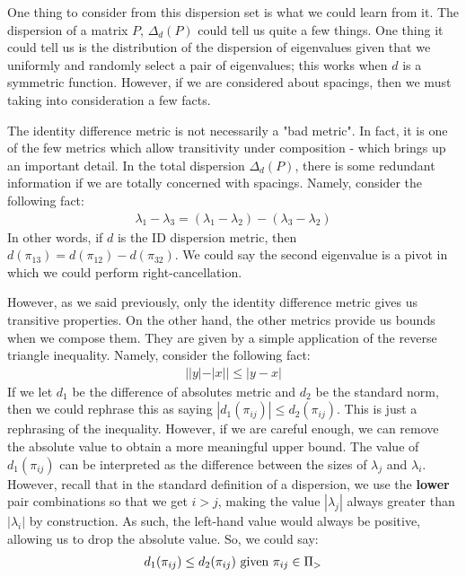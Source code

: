 
One thing to consider from this dispersion set is what we could learn from it. The dispersion of a matrix $P$, $\Delta_d(P)$ could tell us quite a few things. One thing it could tell us is the distribution of the dispersion of eigenvalues given that we uniformly and randomly select a pair of eigenvalues; this works when $d$ is a symmetric function. However, if we are considered about spacings, then we must taking into consideration a few facts.


The identity difference metric is not necessarily a "bad metric". In fact, it is one of the few metrics which allow transitivity under composition - which brings up an important detail. In the total dispersion $\Delta_d(P)$, there is some redundant information if we are totally concerned with spacings. Namely, consider the following fact:
\begin{align*}
\lambda_1 - \lambda_3 = (\lambda_1 - \lambda_2) - (\lambda_3 - \lambda_2)
\end{align*}
In other words, if $d$ is the ID dispersion metric, then $d(\pi_{13}) = d(\pi_{12}) - d(\pi_{32})$. We could say the second eigenvalue is a pivot in which we could perform right-cancellation.


However, as we said previously, only the identity difference metric gives us transitive properties. On the other hand, the other metrics provide us bounds when we compose them. They are given by a simple application of the reverse triangle inequality. Namely, consider the following fact:
\begin{align*}
||y| - |x|| \leq |y - x|
\end{align*}
If we let $d_1$ be the difference of absolutes metric and $d_2$ be the standard norm, then we could rephrase this as saying $|d_1(\pi_{ij})| \leq d_2(\pi_{ij})$. This is just a rephrasing of the inequality. However, if we are careful enough, we can remove the absolute value to obtain a more meaningful upper bound. The value of $d_1(\pi_{ij})$ can be interpreted as the difference between the sizes of $\lambda_j$ and $\lambda_i$. However, recall that in the standard definition of a dispersion, we use the \textbf{lower} pair combinations so that we get $i > j$, making the value $|\lambda_j|$ always greater than $|\lambda_i|$ by construction. As such, the left-hand value would always be positive, allowing us to drop the absolute value. So, we could say:
\begin{align*}
d_1(\pi_{ij}) \leq d_2(\pi_{ij}) \text{ given } \pi_{ij} \in \Pi_>
\end{align*}

